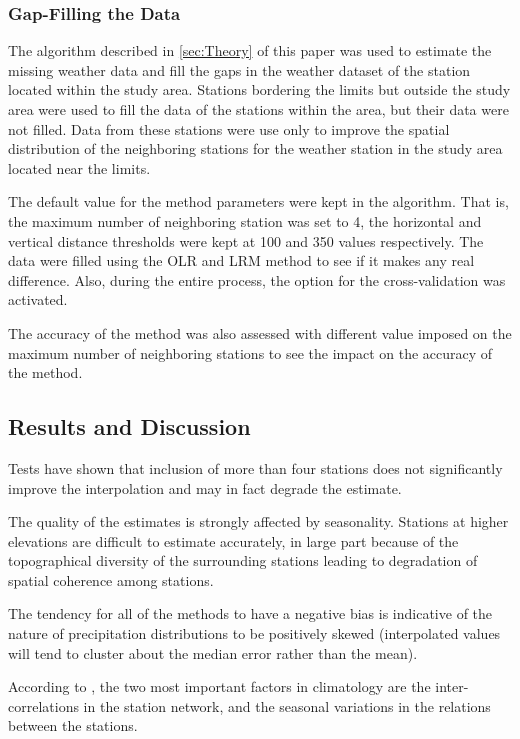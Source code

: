 \documentclass[TechnicalNoteMeteo.tex]{subfiles}
\begin{document}
\subsubsection{Gap-Filling the Data}
The algorithm described in \cref{sec:Theory} of this paper was used to estimate the missing weather data and fill the gaps in the weather dataset of the station located within the study area. Stations bordering the limits but outside the study area were used to fill the data of the stations within the area, but their data were not filled. Data from these stations were use only to improve the spatial distribution of the neighboring stations for the weather station in the study area located near the limits.

The default value for the method parameters were kept in the algorithm. That is, the maximum number of neighboring station was set to 4, the horizontal and vertical distance thresholds were kept at 100 and 350 values respectively. The data were filled using the OLR and LRM method to see if it makes any real difference. Also, during the entire process, the option for the cross-validation was activated.

The accuracy of the method was also assessed with different value imposed on the maximum number of neighboring stations to see the impact on the accuracy of the method.

\subsection{Results and Discussion}

Tests have shown that inclusion of more than four stations does not significantly improve the interpolation and may in fact degrade the estimate. 

The quality of the estimates is strongly affected by seasonality. Stations at higher elevations are difficult to estimate accurately, in large part because of the topographical diversity of the surrounding stations leading to degradation of spatial coherence among stations.

The tendency for all of the methods to have a negative bias is indicative of the nature of precipitation distributions to be positively skewed (interpolated values will tend to cluster about the median error rather than the mean).

According to \cite{xia_forest_1999}, the two most important factors in climatology are the inter-correlations in the station network, and the seasonal variations in the relations between the stations.
\end{document}
